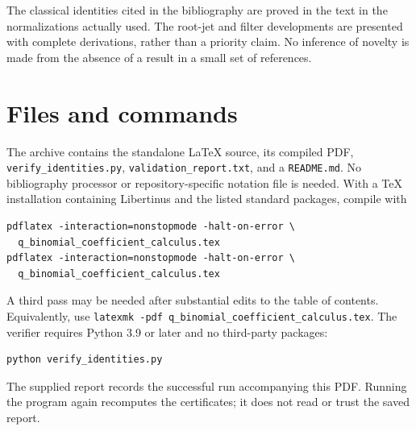 \documentclass[11pt,a4paper,oneside,openany]{book}
\theoremstyle{definition}
\theoremstyle{remark}
\begin{document}
The classical identities cited in the bibliography are proved in the text in
the normalizations actually used. The root-jet and filter developments are
presented with complete derivations, rather than a priority claim. No inference
of novelty is made from the absence of a result in a small set of references.

\section{Files and commands}
The archive contains the standalone \LaTeX{} source, its compiled PDF,
\texttt{verify\_identities.py}, \texttt{validation\_report.txt}, and a
\texttt{README.md}. No bibliography processor or repository-specific notation
file is needed. With a \TeX{} installation containing Libertinus and the listed
standard packages, compile with
\begin{verbatim}
pdflatex -interaction=nonstopmode -halt-on-error \
  q_binomial_coefficient_calculus.tex
pdflatex -interaction=nonstopmode -halt-on-error \
  q_binomial_coefficient_calculus.tex
\end{verbatim}
A third pass may be needed after substantial edits to the table of contents.
Equivalently, use \texttt{latexmk -pdf q\_binomial\_coefficient\_calculus.tex}.
The verifier requires Python 3.9 or later and no third-party packages:
\begin{verbatim}
python verify_identities.py
\end{verbatim}
The supplied report records the successful run accompanying this PDF. Running
the program again recomputes the certificates; it does not read or trust the
saved report.
\end{document}
